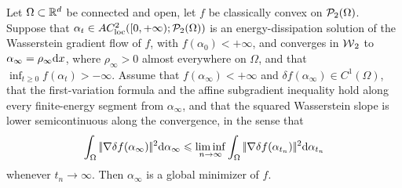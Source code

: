 \begin{prop}\label{prop-classical-convex-stationary}
		Let $\Omega\subset\mathbb{R}^d$ be connected and open, let $f$ be classically convex on $\mathcal{P}_2(\Omega)$. Suppose that $\alpha_t\in AC^2_{\mathrm{loc}}([0,+\infty);\mathcal{P}_2(\Omega))$ is an energy-dissipation solution of the Wasserstein gradient flow of $f$, with $f(\alpha_0)<+\infty$, and converges in $\operatorname{\mathcal{W}}_2$ to $\alpha_\infty=\rho_\infty\mathrm{d} x$, where $\rho_\infty>0$ almost everywhere on $\Omega$, and that $\inf_{t\geq0}f(\alpha_t)>-\infty$. Assume that $f(\alpha_\infty)<+\infty$ and $\delta f(\alpha_\infty)\in C^1(\Omega)$, that the first-variation formula and the affine subgradient inequality hold along every finite-energy segment from $\alpha_\infty$, and that the squared Wasserstein slope is lower semicontinuous along the convergence, in the sense that
	\[
		\int_\Omega|\!| \nabla\delta f(\alpha_\infty) |\!|^2\mathrm{d}\alpha_\infty
		\leqslant
		\liminf_{n\to\infty}
		\int_\Omega|\!| \nabla\delta f(\alpha_{t_n}) |\!|^2\mathrm{d}\alpha_{t_n}
	\]
	whenever $t_n\to\infty$. Then $\alpha_\infty$ is a global minimizer of $f$.
\end{prop}
